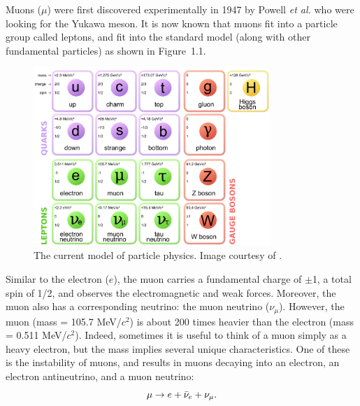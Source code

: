 Muons ($\mu$) were first discovered experimentally in 1947 by Powell \emph{et al.} \cite{lattes} who were looking for the Yukawa meson.
It is now known that muons fit into a particle group called leptons, and fit into the standard model (along with other fundamental particles) as shown in Figure~1.1.

\begin{figure}[h!]
\label{fig:standardmodel}
\centering
\includegraphics[width=0.8\textwidth]{Figures/standardmodel.jpg} 
 \caption[The current model of particle physics.]{The current model of particle physics. Image courtesy of \cite{quantumdiaries}.}
\end{figure}

Similar to the electron ($e$), the muon carries a fundamental charge of $\pm$1, a total spin of 1/2, and observes the electromagnetic and weak forces. Moreover, the muon also has a corresponding neutrino: the muon neutrino ($\nu_\mu$). However, the muon (mass = 105.7 MeV/$c^2$) is about 200 times heavier than the electron (mass = 0.511 MeV/$c^2$). Indeed, sometimes it is useful to think of a muon simply as a heavy electron, but the mass implies several unique characteristics. One of these is the instability of muons, and results in muons decaying into an electron, an electron antineutrino, and a muon neutrino:
\begin{equation} \nonumber
\mu \rightarrow e+\bar{\nu}_e+\nu_\mu.\\
\end{equation}

